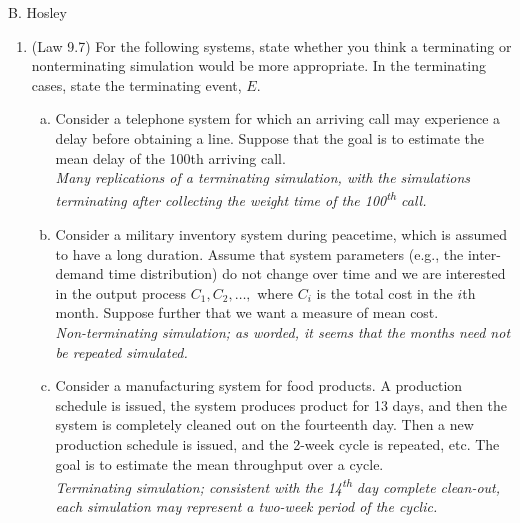\documentclass[12pt]{amsart}
\begin{document}
\raggedbottom

\hspace{\fill} {\large B. Hosley}
\bigskip


\begin{enumerate}[1.]
\item (Law 9.7) For the following systems, state whether you think a terminating or nonterminating
simulation would be more appropriate. In the terminating cases, state the terminating event, \(E\). \\

\begin{enumerate}[a.]
	\item Consider a telephone system for which an arriving call may experience a delay before
	obtaining a line. Suppose that the goal is to estimate the mean delay of the 100th arriving
	call. \\
	
	\textit{Many replications of a terminating simulation, 
		with the simulations terminating after collecting 
		the weight time of the 100\textsuperscript{th} call.} \\
	
	\item Consider a military inventory system during peacetime, which is assumed to have a long
	duration. Assume that system parameters (e.g., the inter-demand time distribution) do not
	change over time and we are interested in the output process \(C_1 , C_2 ,\ldots,\) where \(C_i\) is the
	total cost in the \(i\)th month. Suppose further that we want a measure of mean cost. \\
	
	\textit{Non-terminating simulation; as worded, it seems that the months need not be repeated simulated.}\\
	
	\item Consider a manufacturing system for food products. A production schedule is issued, the
	system produces product for 13 days, and then the system is completely cleaned out on the
	fourteenth day. Then a new production schedule is issued, and the 2-week cycle is
	repeated, etc. The goal is to estimate the mean throughput over a cycle. \\
	
	\textit{Terminating simulation; consistent with the 14\textsuperscript{th} 
		day complete clean-out, each simulation may represent a two-week period
		of the cyclic.}\\
	

\end{enumerate}
\end{enumerate}
\end{document}
